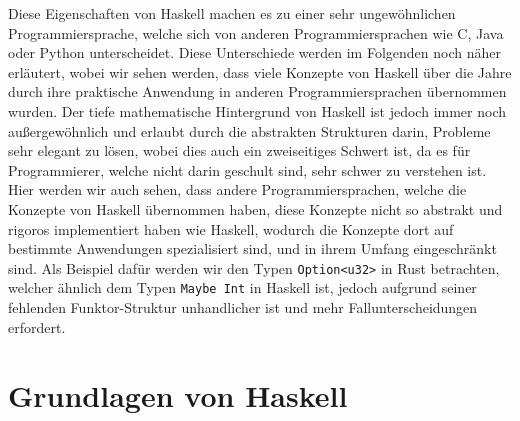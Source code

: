 \documentclass{hhuarticle}
\theoremstyle{definition}
\theoremstyle{theorem}
\begin{document}
  Diese Eigenschaften von Haskell machen es zu einer sehr ungewöhnlichen
  Programmiersprache, welche sich von anderen Programmiersprachen
  wie C, Java oder Python unterscheidet. Diese Unterschiede werden
  im Folgenden noch näher erläutert, wobei wir sehen werden,
  dass viele Konzepte von Haskell über die Jahre durch ihre praktische
  Anwendung in anderen Programmiersprachen übernommen wurden.
  Der tiefe mathematische Hintergrund von Haskell ist jedoch
  immer noch außergewöhnlich und erlaubt durch die abstrakten
  Strukturen darin, Probleme sehr elegant zu lösen, wobei dies auch
  ein zweiseitiges Schwert ist, da es für Programmierer, welche
  nicht darin geschult sind, sehr schwer zu verstehen ist. Hier werden
  wir auch sehen, dass andere Programmiersprachen, welche die
  Konzepte von Haskell übernommen haben, diese Konzepte nicht
  so abstrakt und rigoros implementiert haben wie Haskell, wodurch
  die Konzepte dort auf bestimmte Anwendungen spezialisiert sind,
  und in ihrem Umfang eingeschränkt sind.
  Als Beispiel dafür werden wir den Typen \verb|Option<u32>| in
  Rust betrachten, welcher ähnlich dem Typen \verb|Maybe Int| in Haskell
  ist, jedoch aufgrund seiner fehlenden Funktor-Struktur unhandlicher
  ist und mehr Fallunterscheidungen erfordert.






  \section{Grundlagen von Haskell}
  
\end{document}
